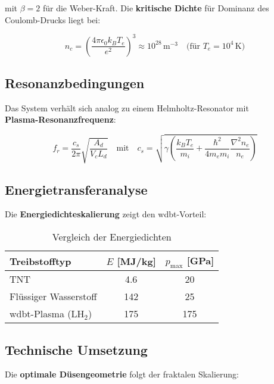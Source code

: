 mit $\beta = 2$ für die Weber-Kraft. Die \textbf{kritische Dichte} für Dominanz des Coulomb-Drucks liegt bei:

\begin{equation}
n_c = \left(\frac{4\pi \epsilon_0 k_B T_e}{e^2}\right)^3 \approx 10^{28}\,\text{m}^{-3}\quad\text{(für }T_e=10^4\,\text{K)}
\end{equation}

\subsection{Resonanzbedingungen}
\label{subsec:resonanz}

Das System verhält sich analog zu einem Helmholtz-Resonator mit\\\textbf{Plasma-Resonanzfrequenz}:

\begin{equation}
f_r = \frac{c_s}{2\pi}\sqrt{\frac{A_d}{V_c L_d}} \quad \text{mit} \quad c_s = \sqrt{\gamma \left(\frac{k_B T_e}{m_i} + \frac{\hbar^2}{4m_e m_i}\frac{\nabla^2 n_e}{n_e}\right)}
\label{eq:resonanz}
\end{equation}

\subsection{Energietransferanalyse}
\label{subsec:energie}

Die \textbf{Energiedichteskalierung} zeigt den \gls{wdbt}-Vorteil:

\begin{table}[h]
\centering
\caption{Vergleich der Energiedichten}
\label{tab:energie}
\begin{tabular}{lcc}
\toprule
Treibstofftyp & $E$ [MJ/kg] & $p_{\text{max}}$ [GPa] \\
\midrule
TNT & 4.6 & 20 \\
Flüssiger Wasserstoff & 142 & 25 \\
\gls{wdbt}-Plasma (LH$_2$) & 175 & 175 \\
\bottomrule
\end{tabular}
\end{table}

\subsection{Technische Umsetzung}
\label{subsec:tech}

Die \textbf{optimale Düsengeometrie} folgt der fraktalen Skalierung:

